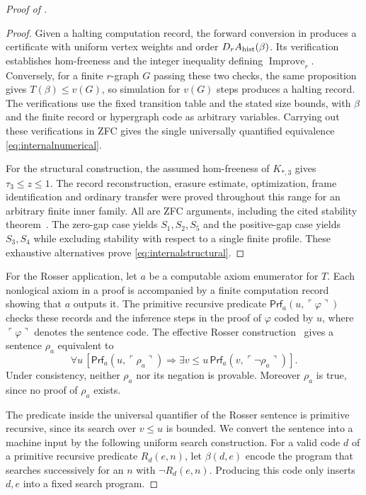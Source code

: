 \documentclass[10pt]{article}
\numberwithin{equation}{section}
\theoremstyle{definition}
\newcommand{\Improve}{\operatorname{Improve}}
\begin{document}
\begin{proof}[Proof of ]
\begin{proof}
Given a halting computation record, the forward conversion in  produces a certificate with uniform vertex weights and order $D_rA_{\rm hist}(\beta)$. Its verification establishes hom-freeness and the integer inequality defining $\Improve_r$. Conversely, for a finite $r$-graph $G$ passing these two checks, the same proposition gives $T(\beta)\le v(G)$, so simulation for $v(G)$ steps produces a halting record. The verifications use the fixed transition table and the stated size bounds, with $\beta$ and the finite record or hypergraph code as arbitrary variables. Carrying out these verifications in ZFC gives the single universally quantified equivalence \eqref{eq:internalnumerical}.

For the structural construction, the assumed hom-freeness of $K_{*,3}$ gives $\tau_3\le z\le1$. The record reconstruction, erasure estimate, optimization, frame identification and ordinary transfer were proved throughout this range for an arbitrary finite inner family. All are ZFC arguments, including the cited stability theorem~\cite{LMR2023}. The zero-gap case yields $S_1,S_2,S_5$ and the positive-gap case yields $S_3,S_4$ while excluding stability with respect to a single finite profile. These exhaustive alternatives prove \eqref{eq:internalstructural}.
\end{proof}

For the Rosser application, let $a$ be a computable axiom enumerator for $T$. Each nonlogical axiom in a proof is accompanied by a finite computation record showing that $a$ outputs it. The primitive recursive predicate $\mathsf{Prf}_a(u,\ulcorner\varphi\urcorner)$ checks these records and the inference steps in the proof of $\varphi$ coded by $u$, where $\ulcorner\varphi\urcorner$ denotes the sentence code. The effective Rosser construction~\cite{Rosser1936,BoolosBurgessJeffrey2007} gives a sentence $\rho_a$ equivalent to
\[
 \forall u\,[\mathsf{Prf}_a(u,\ulcorner\rho_a\urcorner)
       \Longrightarrow\exists v\le u\,
              \mathsf{Prf}_a(v,\ulcorner\neg\rho_a\urcorner)].
\]
Under consistency, neither $\rho_a$ nor its negation is provable. Moreover $\rho_a$ is true, since no proof of $\rho_a$ exists.

The predicate inside the universal quantifier of the Rosser sentence is primitive recursive, since its search over $v\le u$ is bounded. We convert the sentence into a machine input by the following uniform search construction. For a valid code $d$ of a primitive recursive predicate $R_d(e,n)$, let $\beta(d,e)$ encode the program that searches successively for an $n$ with $\neg R_d(e,n)$. Producing this code only inserts $d,e$ into a fixed search program.


\end{proof}
\end{document}
